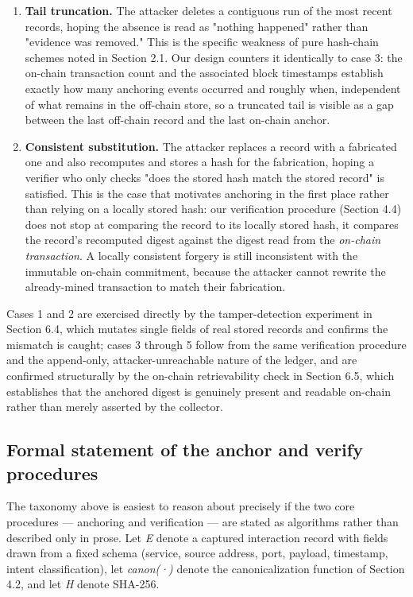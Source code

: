 \documentclass[journal]{IEEEtran}
\begin{document}
\begin{enumerate}
\item \textbf{Tail truncation.} The attacker deletes a contiguous run of the most recent records, hoping the absence is read as "nothing happened" rather than "evidence was removed." This is the specific weakness of pure hash-chain schemes noted in Section 2.1. Our design counters it identically to case 3: the on-chain transaction count and the associated block timestamps establish exactly how many anchoring events occurred and roughly when, independent of what remains in the off-chain store, so a truncated tail is visible as a gap between the last off-chain record and the last on-chain anchor.
\item \textbf{Consistent substitution.} The attacker replaces a record with a fabricated one and also recomputes and stores a hash for the fabrication, hoping a verifier who only checks "does the stored hash match the stored record" is satisfied. This is the case that motivates anchoring in the first place rather than relying on a locally stored hash: our verification procedure (Section 4.4) does not stop at comparing the record to its locally stored hash, it compares the record's recomputed digest against the digest read from the \emph{on-chain transaction}. A locally consistent forgery is still inconsistent with the immutable on-chain commitment, because the attacker cannot rewrite the already-mined transaction to match their fabrication.
\end{enumerate}

Cases 1 and 2 are exercised directly by the tamper-detection experiment in Section 6.4, which mutates single fields of real stored records and confirms the mismatch is caught; cases 3 through 5 follow from the same verification procedure and the append-only, attacker-unreachable nature of the ledger, and are confirmed structurally by the on-chain retrievability check in Section 6.5, which establishes that the anchored digest is genuinely present and readable on-chain rather than merely asserted by the collector.

\subsection{Formal statement of the anchor and verify procedures}

The taxonomy above is easiest to reason about precisely if the two core procedures --- anchoring and verification --- are stated as algorithms rather than described only in prose. Let \emph{E} denote a captured interaction record with fields drawn from a fixed schema (service, source address, port, payload, timestamp, intent classification), let \emph{canon(·)} denote the canonicalization function of Section 4.2, and let \emph{H} denote SHA-256.
\end{document}
